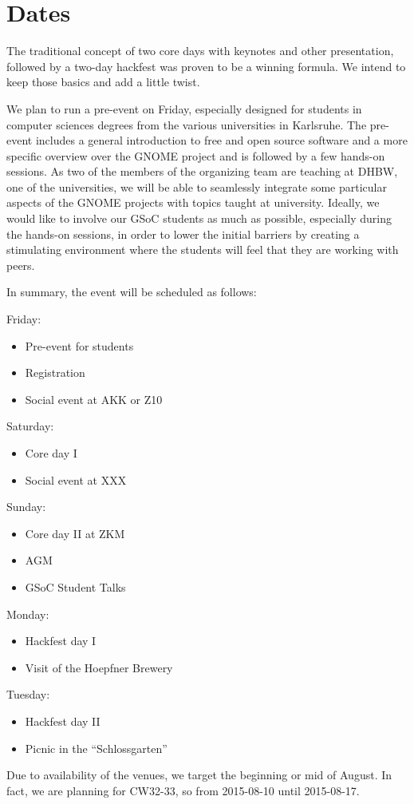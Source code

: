 \section{Dates}

The traditional concept of two core days with keynotes and other 
presentation, followed by a two-day hackfest was proven to be a winning 
formula. We intend to keep those basics and add a little twist.

We plan to run a pre-event on Friday, especially designed for 
students in computer sciences degrees from the various universities in 
Karlsruhe. The pre-event includes a general introduction to free and 
open source software and a more specific overview over the GNOME 
project and is followed by a few hands-on sessions. As two of the 
members of the organizing team are teaching at DHBW, one of the 
universities, we will be able to seamlessly integrate some particular 
aspects of the GNOME projects with topics taught at university. 
Ideally, we would like to involve our GSoC students as much as 
possible, especially during the hands-on sessions, in order to lower 
the initial barriers by creating a stimulating environment where the 
students will feel that they are working with peers.

\iffalse
Furthermore, we plan to host the Sunday lecture session at ZKM, where 
the end of the day can then be spent discovering the incredible variety 
of art exhibitions and challenging each other at various games.
\fi

In summary, the event will be scheduled as follows:

Friday:
\begin{itemize}
\item Pre-event for students
\item Registration
\item Social event at AKK or Z10
\end{itemize}

Saturday:
\begin{itemize}
\item  Core day I
\item  Social event at XXX
\end{itemize}

Sunday:
\begin{itemize}
\item  Core day II at ZKM
\item  AGM
\item  GSoC Student Talks
\end{itemize}

Monday:
\begin{itemize}
\item  Hackfest day I
\item  Visit of the Hoepfner Brewery
\end{itemize}

Tuesday:
\begin{itemize}
\item  Hackfest day II
\item  Picnic in the “Schlossgarten”
\end{itemize}


Due to availability of the venues, we target the beginning or mid
of August.
In fact, we are planning for CW32-33, so from 2015-08-10 until 2015-08-17.
